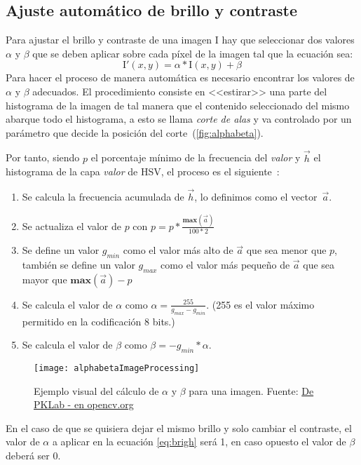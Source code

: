 \subsection{Ajuste automático de brillo y contraste}
Para ajustar el brillo y contraste de una imagen $\textrm{I}$ hay que seleccionar dos valores $\alpha$ y $\beta$ que se deben aplicar sobre cada píxel de la imagen tal que la ecuación sea:
\begin{equation}
\textrm{I}'(x,y) = \alpha*\textrm{I}(x,y) + \beta\label{eq:brigh}
\end{equation}
Para hacer el proceso de manera automática es necesario encontrar los valores de $\alpha$ y $\beta$ adecuados. 
El procedimiento consiste en <<estirar>> una parte del histograma de la imagen de tal manera que el contenido seleccionado del mismo abarque todo el histograma, a esto se llama \textit{corte de alas} y va controlado por un parámetro que decide la posición del corte~(\autoref{fig:alphabeta}).

Por tanto, siendo $p$ el porcentaje mínimo de la frecuencia del \textit{valor} y $\vec{h}$ el histograma de la capa \textit{valor} de HSV, el proceso es el siguiente~\cite{pklab2017bright}:

\begin{enumerate}
	\item Se calcula la frecuencia acumulada de $\vec{h}$, lo definimos como el vector~$\vec{a}$.
	\item Se actualiza el valor de $p$ con $p = p*\frac{\mathbf{max}(\vec{a})}{100*2}$
	\item Se define un valor $g_{min}$ como el valor más alto de $\vec{a}$ que sea menor que $p$, también se define un valor $g_{max}$ como el valor más pequeño de $\vec{a}$ que sea mayor que $\mathbf{max}(\vec{a})-p$
	\item Se calcula el valor de $\alpha$ como $\alpha =  \frac{255}{g_{max} - g_{min}}$. (255 es el valor máximo permitido en la codificación 8 bits.)
	\item Se calcula el valor de $\beta$ como $\beta = -g_{min} * \alpha$.
\end{enumerate}

\begin{figure}[h]
	\centering
	\texttt{[image: alphabetaImageProcessing]}
	\caption[Ejemplo visual del cálculo de $\alpha$ y $\beta$ para una imagen]{Ejemplo visual del cálculo de $\alpha$ y $\beta$ para una imagen. Fuente: \href{https://answers.opencv.org/question/75510/how-to-make-auto-adjustmentsbrightness-and-contrast-for-image-android-opencv-image-correction/}{De PKLab - en opencv.org}}
	\label{fig:alphabeta}
\end{figure}

En el caso de que se quisiera dejar el mismo brillo y solo cambiar el contraste, el valor de $\alpha$ a aplicar en la ecuación \eqref{eq:brigh} será 1, en caso opuesto el valor de $\beta$ deberá ser 0.

